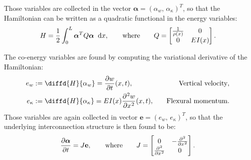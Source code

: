 \documentclass[preprint,12pt]{elsarticle}
\begin{document}
Those variables are collected in the vector $\bm{\alpha} = (\alpha_{w}, \, \alpha_{\kappa})^T $, so that the Hamiltonian can be written as a quadratic functional in the energy variables: 
\begin{equation}
H = \frac{1}{2} \int_{0}^{L} \bm{\alpha}^T Q \bm{\alpha} \; \d{x},
\qquad \text{where} \qquad
Q = 
\begin{bmatrix}
\frac{1}{\rho(x)} & 0 \\
0 & EI(x) \\
\end{bmatrix}.
\end{equation}

The co-energy variables are found by computing the variational derivative of the Hamiltonian:
\begin{equation}
\begin{aligned}
e_{w} &:= \diffd{H}{\alpha_w} = \diffp{w}{t}(x,t) ,  &\quad \text{Vertical velocity}, \\
e_{\kappa} &:= \diffd{H}{\alpha_{\kappa}} =EI(x) \diffp[2]{w}{x}(x,t),  &\quad \text{Flexural momentum}. \\
\end{aligned}
\end{equation}
Those variables are again collected in vector $\bm{e} = (e_{w}, \, e_{\kappa})^T $, so that the underlying interconnection structure is then found to be:
\begin{equation}
\label{eq:PH_Timo}
\diffp{\bm{\alpha}}{t} = J \mathbf{e},  	\qquad \text{where} \qquad
J = 
\begin{bmatrix}
0 & -\diffp[2]{}{x} \\
\diffp[2]{}{x} & 0 \\
\end{bmatrix}.
\end{equation}
\end{document}

